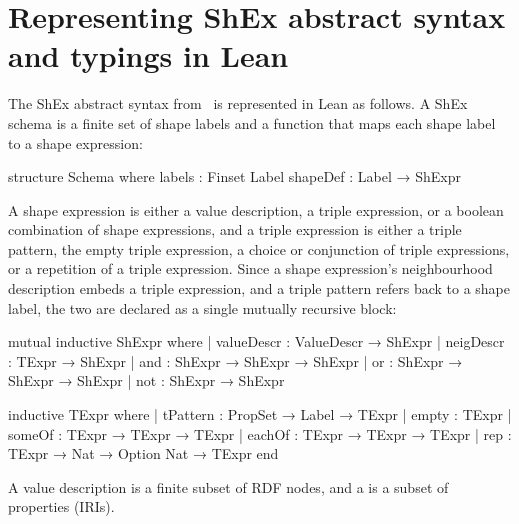 \section{Representing ShEx abstract syntax and typings in Lean} \label{sec:shex_lean}

The ShEx abstract syntax from~\cite{BGP17} is represented in Lean as follows.
A ShEx schema is a finite set of shape labels and a function that maps each
shape label to a shape expression:

\begin{leanlisting}
structure Schema where
  labels   : Finset Label
  shapeDef : Label → ShExpr
\end{leanlisting}

A shape expression  is either a value description,
 a triple expression, or a boolean combination of shape expressions,
 and a triple expression  is either a triple pattern,
 the empty triple expression,
 a choice or conjunction of triple expressions,
 or a repetition of a triple expression.
 Since a shape expression's neighbourhood description embeds a triple
 expression, and a triple pattern refers back to a shape label,
 the two are declared as a single mutually recursive block:

 \begin{leanlisting}
mutual
inductive ShExpr where
  | valueDescr : ValueDescr → ShExpr
  | neigDescr  : TExpr → ShExpr
  | and        : ShExpr → ShExpr → ShExpr
  | or         : ShExpr → ShExpr → ShExpr
  | not        : ShExpr → ShExpr

inductive TExpr where
  | tPattern : PropSet → Label → TExpr
  | empty    : TExpr
  | someOf   : TExpr → TExpr → TExpr
  | eachOf   : TExpr → TExpr → TExpr
  | rep      : TExpr → Nat → Option Nat → TExpr
end
\end{leanlisting}

A value description  is a finite subset of RDF nodes, 
 and a  is a subset of properties (IRIs).


